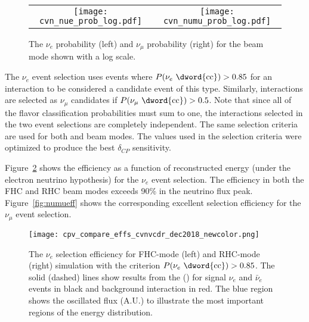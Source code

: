 \begin{figure}
    \centering
    \begin{tabular}{cc}
		\texttt{[image: cvn\_nue\_prob\_log.pdf]} &
		\texttt{[image: cvn\_numu\_prob\_log.pdf]} 
	\end{tabular}
	\caption[The CVN \nue CC probability and \numu CC probability for the FHC beam mode]{The  $\nu_e$  probability (left) and $\nu_\mu$  probability (right) for the  beam mode shown with a log scale.}
    \label{fig:cvnprob}
\end{figure}

The $\nu_e$  event selection uses events where $P(\nu_e \textrm{ \dword{cc}}) > 0.85$ for an interaction to be considered a candidate event of this type. Similarly, interactions are selected as $\nu_\mu$  candidates if $P(\nu_\mu \textrm{ \dword{cc}}) > 0.5$. Note that since all of the flavor classification probabilities must sum to one, the interactions selected in the two event selections are completely independent. The same selection criteria are used for both  and  beam modes. The values used in the selection criteria were optimized to produce the best $\delta_{CP}$ sensitivity.

Figure~\ref{fig:nueeff} shows the efficiency as a function of reconstructed energy (under the electron neutrino hypothesis) for the $\nu_e$ event selection. The efficiency in both the FHC and RHC beam modes exceeds 90\% in the neutrino flux peak. %
Figure~\ref{fig:numueff} shows the corresponding excellent selection efficiency for the $\nu_\mu$ event selection.

\begin{figure}
    \centering
		\texttt{[image: cpv\_compare\_effs\_cvnvcdr\_dec2018\_newcolor.png]} %
	\caption[The $\nu_e$ CC selection efficiency for $P(\nu_e \textrm{CC}) > 0.85$]{The $\nu_e$  selection efficiency for FHC-mode (left) and RHC-mode (right) simulation with the criterion $P(\nu_e \textrm{ \dword{cc}}) > 0.85$. The solid (dashed) lines show results from the  () for signal $\nu_e$  and $\bar{\nu}_e$  events in black and  background interaction in red. The blue region shows the oscillated flux (A.U.) to illustrate the most important regions of the energy distribution.}
    \label{fig:nueeff}
\end{figure}

